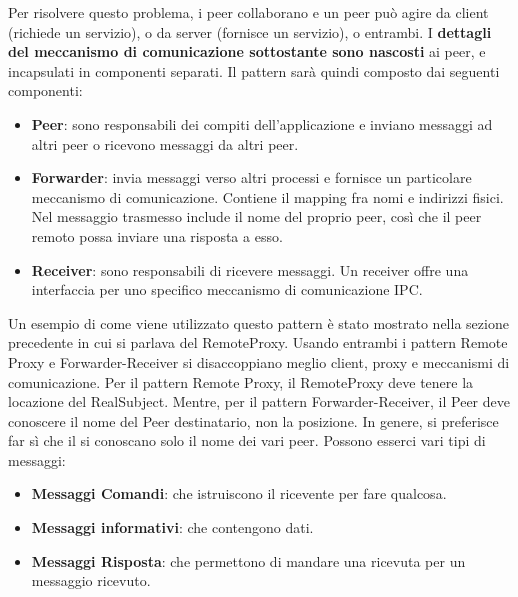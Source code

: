 Per risolvere questo problema, i peer collaborano e un peer può agire da client (richiede un servizio), o da server (fornisce un servizio), o entrambi. I \textbf{dettagli del meccanismo di comunicazione sottostante sono nascosti} ai peer, e incapsulati in componenti separati. Il pattern sarà quindi composto dai seguenti componenti:
\begin{itemize}
    \item \textbf{Peer}: sono responsabili dei compiti dell’applicazione e inviano messaggi ad altri peer o ricevono messaggi da altri peer.
    \item \textbf{Forwarder}: invia messaggi verso altri processi e fornisce un particolare meccanismo di comunicazione. Contiene il mapping fra nomi e indirizzi fisici. Nel messaggio trasmesso include il nome del proprio peer, così che il peer remoto possa inviare una risposta a esso.
    \item \textbf{Receiver}: sono responsabili di ricevere messaggi. Un receiver offre una interfaccia per uno specifico meccanismo di comunicazione IPC.
\end{itemize}
Un esempio di come viene utilizzato questo pattern è stato mostrato nella sezione precedente in cui si parlava del RemoteProxy. Usando entrambi i pattern Remote Proxy e Forwarder-Receiver si disaccoppiano meglio client, proxy e meccanismi di comunicazione. Per il pattern Remote Proxy, il RemoteProxy deve tenere la locazione del
RealSubject. Mentre, per il pattern Forwarder-Receiver, il Peer deve conoscere il nome del Peer destinatario, non la posizione. In genere, si preferisce far sì che il si conoscano solo il nome dei vari peer. Possono esserci vari tipi di messaggi:
\begin{itemize}
    \item \textbf{Messaggi Comandi}: che istruiscono il ricevente per fare qualcosa.
    \item \textbf{Messaggi informativi}: che contengono dati.
    \item \textbf{Messaggi Risposta}: che permettono di mandare una ricevuta per un messaggio ricevuto.
\end{itemize}

